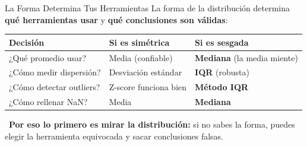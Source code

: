 \documentclass[aspectratio=169, 11pt]{beamer}
\begin{document}
\begin{frame}[shrink=10]{La Forma Determina Tus Herramientas}
  \vspace{-4pt}
  {\footnotesize
    La forma de la distribución determina \textbf{qué herramientas usar}
    y \textbf{qué conclusiones son válidas}:}

  \vspace{6pt}
  {\small
  \renewcommand{\arraystretch}{1.3}
  \begin{tabular}{@{}p{3.2cm}p{4.3cm}p{4.3cm}@{}}
    \toprule
    \textbf{Decisión} & \textbf{Si es simétrica} & \textbf{Si es sesgada} \\
    \midrule
    ¿Qué promedio usar? &
      Media (confiable) &
      \textbf{Mediana} (la media miente) \\
    ¿Cómo medir dispersión? &
      Desviación estándar &
      \textbf{IQR} (robusta) \\
    ¿Cómo detectar outliers? &
      Z-score funciona bien &
      \textbf{Método IQR} \\
    ¿Cómo rellenar NaN? &
      Media &
      \textbf{Mediana} \\
    \bottomrule
  \end{tabular}
  }

  \vspace{6pt}
  {\scriptsize\color{textMuted}
    \faExclamationTriangle\ \textbf{Por eso lo primero es mirar la distribución:}
    si no sabes la forma, puedes elegir la herramienta equivocada y sacar conclusiones falsas.}
\end{frame}
\end{document}
